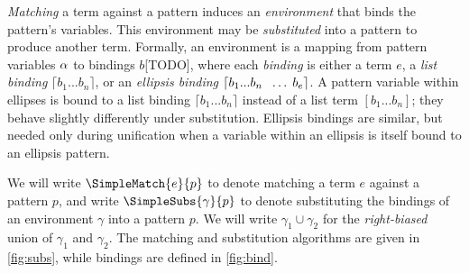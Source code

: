 \newcommand{\blist}[1]{\lceil #1 \rceil}

\emph{Matching} a term against a pattern induces an \emph{environment}
that binds the pattern's variables. This environment may be
\emph{substituted} into a pattern to produce another term. Formally, an
environment is a mapping from pattern variables $\alpha$ to bindings $b$[TODO],
where each \emph{binding} is either a term $e$, a \emph{list binding}
$\blist{b_1...b_n}$, or an \emph{ellipsis binding}
$\blist{b_1...b_n\ \ddd{b_e}}$. A pattern variable within ellipses is
bound to a list binding $\blist{b_1...b_n}$ instead of a list term
$[b_1...b_n]$; they behave slightly differently under
substitution. Ellipsis bindings are similar, but needed only during
unification when a variable within an ellipsis is itself bound to an
ellipsis pattern.

We will write $\SimpleMatch{e}{p}$ to denote matching a term $e$ against a pattern
$p$, and write $\SimpleSubs{\gamma}{p}$ to denote substituting the bindings of an
environment $\gamma$ into a pattern $p$.
We will write $\gamma_1 \cup \gamma_2$ for the
\emph{right-biased} union of $\gamma_1$ and $\gamma_2$. The matching and
substitution
algorithms are given in \cref{fig:subs}, while bindings are defined in
\cref{fig:bind}.



